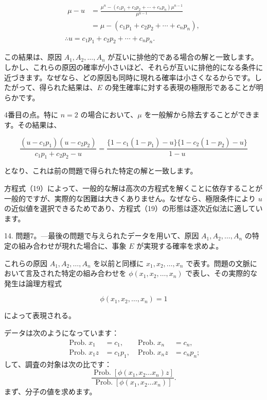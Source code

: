 \documentclass[a4paper,11pt,openany]{ltjsbook}
\begin{document}
\begin{gather*}
\begin{split}
  \mu - u
  &= \frac{\mu^n - (c_1p_1 + c_2p_2 + \cdots + c_np_n)\mu^{n-1}}{\mu^{n-1}} \\
  &= \mu - (c_1p_1 + c_2p_2 + \cdots + c_np_n),
\end{split}   \\
  \therefore u = c_1p_1 + c_2p_2 + \cdots + c_np_n.
\end{gather*}

この結果は、原因 $A_1, A_2, \ldots, A_n$ が互いに排他的である場合の解と一致します。しかし、これらの原因の確率が小さいほど、それらが互いに排他的になる条件に近づきます。なぜなら、どの原因も同時に現れる確率は小さくなるからです。したがって、得られた結果は、$E$ の発生確率に対する表現の極限形であることが明らかです。

4番目の点。特に $n = 2$ の場合において、$\mu$ を一般解から除去することができます。その結果は、

\[
\frac{(u - c_1p_1)(u - c_2p_2)}{c_1p_1 + c_2p_2 - u} = \frac{\{1 - c_1(1 - p_1) - u\}\{1 - c_2(1 - p_2) - u\}}{1 - u}
\]

となり、これは前の問題で得られた特定の解と一致します。

方程式（19）によって、一般的な解は高次の方程式を解くことに依存することが一般的ですが、実際的な困難は大きくありません。なぜなら、極限条件により $u$ の近似値を選択できるためであり、方程式（19）の形態は逐次近似法に適しています。

14. 問題7。---最後の問題で与えられたデータを用いて、原因 $A_1, A_2, \ldots, A_n$ の特定の組み合わせが現れた場合に、事象 $E$ が実現する確率を求めよ。

これらの原因 $A_1, A_2, \ldots, A_n$ を以前と同様に $x_1, x_2, \ldots, x_n$ で表す。問題の文脈において言及された特定の組み合わせを $\phi(x_1, x_2, \ldots, x_n)$ で表し、その実際的な発生は論理方程式

\[
\phi(x_1, x_2, \ldots, x_n) = 1
\]

によって表現される。

データは次のようになっています：
\begin{align}\tag{1}
\operatorname{Prob.} x_1 &= c_1, & \operatorname{Prob.} x_n &= c_n, \\
\operatorname{Prob.} x_1 z &= c_1 p_1, & \operatorname{Prob.} x_n z &= c_n p_n;
\end{align}して、調査の対象は次の比です：
\begin{equation}\tag{2}
\frac{\operatorname{Prob.} [\phi(x_1, x_2 \dotsc x_n)z]}{\operatorname{Prob.} [\phi(x_1, x_2 \dotsc x_n)]}.
\end{equation}
まず、分子の値を求めます。
\end{document}
